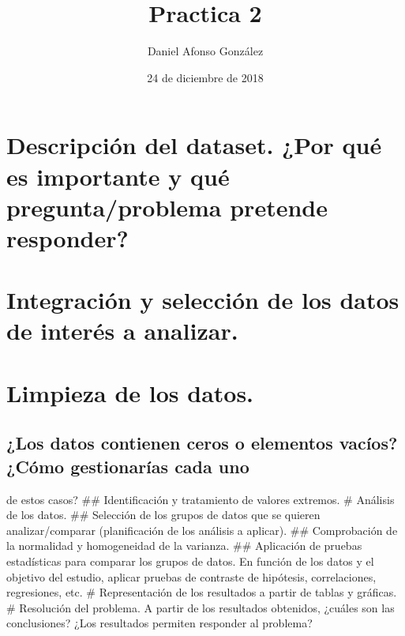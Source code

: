 \documentclass[]{article}
\title{Practica 2}
\author{Daniel Afonso González}
\date{24 de diciembre de 2018}
\begin{document}
\maketitle

{
\setcounter{tocdepth}{2}
\tableofcontents
}
\section{Descripción del dataset. ¿Por qué es importante y qué
pregunta/problema pretende
responder?}\label{descripcion-del-dataset.-por-que-es-importante-y-que-preguntaproblema-pretende-responder}

\section{Integración y selección de los datos de interés a
analizar.}\label{integracion-y-seleccion-de-los-datos-de-interes-a-analizar.}

\section{Limpieza de los datos.}\label{limpieza-de-los-datos.}

\subsection{¿Los datos contienen ceros o elementos vacíos? ¿Cómo
gestionarías cada
uno}\label{los-datos-contienen-ceros-o-elementos-vacios-como-gestionarias-cada-uno}

de estos casos? \#\# Identificación y tratamiento de valores extremos.
\# Análisis de los datos. \#\# Selección de los grupos de datos que se
quieren analizar/comparar (planificación de los análisis a aplicar).
\#\# Comprobación de la normalidad y homogeneidad de la varianza. \#\#
Aplicación de pruebas estadísticas para comparar los grupos de datos. En
función de los datos y el objetivo del estudio, aplicar pruebas de
contraste de hipótesis, correlaciones, regresiones, etc. \#
Representación de los resultados a partir de tablas y gráficas. \#
Resolución del problema. A partir de los resultados obtenidos, ¿cuáles
son las conclusiones? ¿Los resultados permiten responder al problema?
\end{document}
